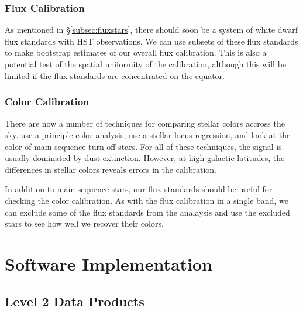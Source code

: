 \documentclass[12pt,preprint]{aastex}
\begin{document}
\subsubsection{Flux Calibration}

As mentioned in \S\ref{subsec:fluxstars}, there should soon be a
system of white dwarf flux standards with HST observations.  We can
use subsets of these flux standards to make bootstrap estimates of our
overall flux calibration.  This is also a potential test of the
spatial uniformity of the calibration, although this will be limited
if the flux standards are concentrated on the equator.

\subsubsection{Color Calibration}

There are now a number of techniques for comparing stellar colors
accross the sky.  \citet{Ivezic04} use a principle color analysis,
\citet{High09} use a stellar locus regression, and \citet{Schlafly10}
look at the color of main-sequence turn-off stars.  For all of these
techniques, the signal is usually dominated by dust extinction.
However, at high galactic latitudes, the differences in stellar colors
reveals errors in the calibration.

In addition to main-sequence stars, our flux standards should be
useful for checking the color calibration.  As with the flux
calibration in a single band, we can exclude some of the flux
standards from the analaysis and use the excluded stars to see how
well we recover their colors.


\section{Software Implementation}
\label{sec:software}

\subsection{Level 2 Data Products}
\end{document}
